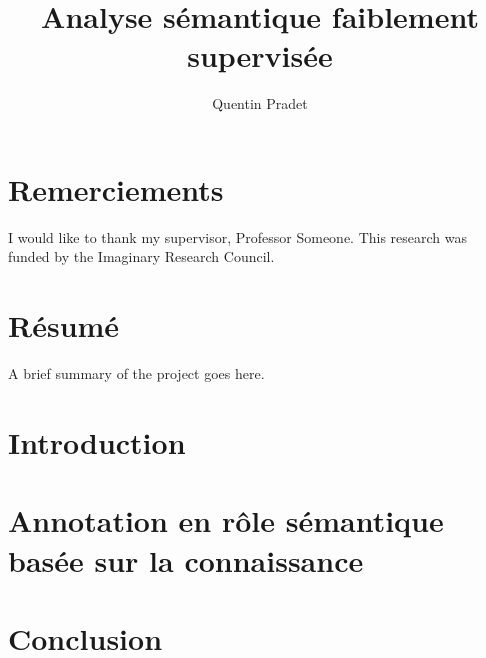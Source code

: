 \documentclass[oneside]{scrbook}
\title{Analyse sémantique faiblement supervisée}
\author{Quentin Pradet}
\date{}
\begin{document}
 

\maketitle 

\frontmatter 
\tableofcontents 
\listoffigures 
\listoftables 

\chapter{Remerciements} 

I would like to thank my supervisor, Professor Someone. This 
research was funded by the Imaginary Research Council. 

\chapter{Résumé} 

A brief summary of the project goes here. 


\mainmatter 

\chapter{Introduction} 
\label{ch:intro} 





\chapter{Annotation en rôle sémantique basée sur la connaissance}
\label{ch:srl}

\chapter{Conclusion} 
\label{ch:conc} 

\backmatter 





\end{document}
